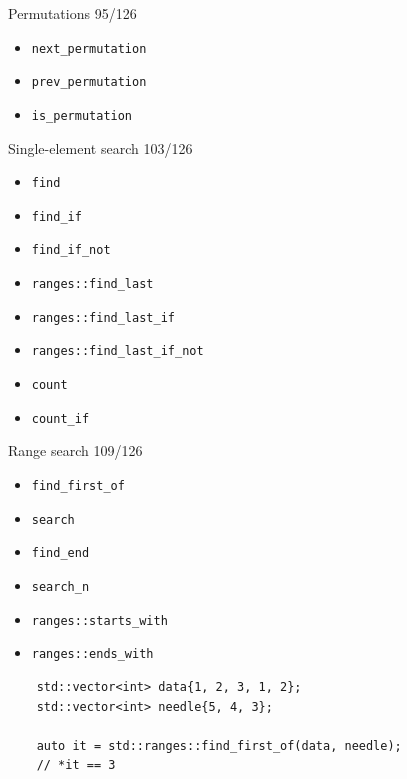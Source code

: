 \documentclass[aspectratio=169]{beamer}
\begin{document}
\begin{frame}{Permutations 95/126}
  \begin{itemize}
    \item{\texttt{next_permutation}}
    \item{\texttt{prev_permutation}}
    \item{\texttt{is_permutation}}
  \end{itemize}
\end{frame}

\begin{frame}{Single-element search 103/126}
  \begin{itemize}
    \item{\texttt{find}}
    \item{\texttt{find_if}}
    \item{\texttt{find_if_not}}
    \item{\texttt{ranges::find_last}}
    \item{\texttt{ranges::find_last_if}}
    \item{\texttt{ranges::find_last_if_not}}
    \item{\texttt{count}}
    \item{\texttt{count_if}}
  \end{itemize}
\end{frame}

\begin{frame}{Range search 109/126}
  \begin{itemize}
    \item{\texttt{find_first_of}}
    \item{\texttt{search}}
    \item{\texttt{find_end}}
    \item{\texttt{search_n}}
    \item{\texttt{ranges::starts_with}}
    \item{\texttt{ranges::ends_with}}
  \end{itemize}
\end{frame}

\begin{frame}[fragile]{}
  \begin{verbatim}
    std::vector<int> data{1, 2, 3, 1, 2};
    std::vector<int> needle{5, 4, 3};

    auto it = std::ranges::find_first_of(data, needle);
    // *it == 3
  \end{verbatim}
\end{frame}
\end{document}
